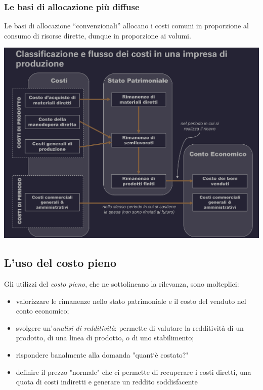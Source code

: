 \documentclass{article}
\begin{document}
\subsubsection{Le basi di allocazione più diffuse}
Le basi di allocazione “convenzionali” allocano i costi comuni in proporzione al consumo di risorse dirette, dunque in proporzione ai volumi.
\begin{center}
    \includegraphics[scale=0.25]{Image/BasiAlloc_1.png}
\end{center}


\subsection{L'uso del costo pieno}
Gli utilizzi del \textit{costo pieno}, che ne sottolineano la rilevanza, sono molteplici:
\begin{itemize}
    \item valorizzare le rimanenze nello stato patrimoniale e il costo del venduto nel conto economico;
    \item svolgere un'\textit{analisi di redditività}: permette di valutare la redditività di un prodotto, di una linea di prodotto, o di uno stabilimento;
    \item rispondere banalmente alla domanda "quant`è costato?"
    \item definire il prezzo "normale" che ci permette di recuperare i costi diretti, una quota di costi indiretti  e generare un reddito soddisfacente
\end{itemize}
\end{document}
